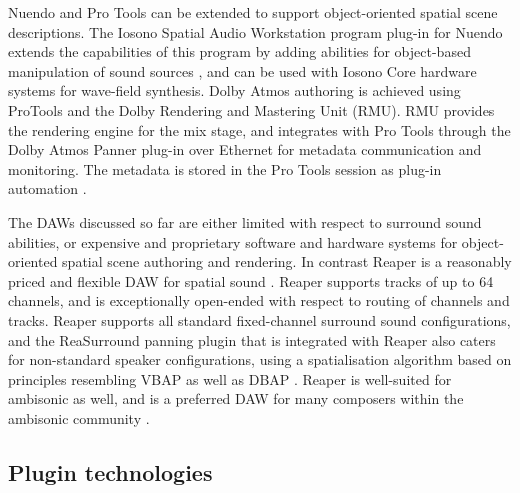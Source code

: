 \documentclass{article}
\begin{document}
Nuendo and Pro Tools can be extended to support object-oriented spatial scene descriptions.
The Iosono Spatial Audio Workstation program plug-in for Nuendo extends the capabilities of this program by adding abilities for object-based manipulation of sound sources \cite{iosono2012:workstation}, and can be used with Iosono Core hardware systems for wave-field synthesis.
Dolby Atmos authoring is achieved using ProTools and the Dolby Rendering and Mastering Unit (RMU).
RMU provides the rendering engine for the mix stage, and integrates with Pro Tools through the Dolby Atmos Panner plug-in over Ethernet for metadata communication and monitoring. 
The metadata is stored in the Pro Tools session as plug-in automation \cite{dolby:2013authoring}.

The DAWs discussed so far are either limited with respect to surround sound abilities, or expensive and proprietary software and hardware systems for object-ori\-ented spatial scene authoring and rendering.
In contrast Reaper is a reasonably priced and flexible DAW for spatial sound \cite{cockos:2014reaper}.
Reaper supports tracks of up to 64 channels, and is exceptionally open-ended with respect to routing of channels and tracks.
Reaper supports all standard fixed-channel surround sound configurations, and the ReaSurround panning plugin that is integrated with Reaper also caters for non-standard speaker configurations, using a spatialisation algorithm based on principles resembling VBAP \cite{Pulkki:1997vbap} as well as DBAP \cite{Lossius:2009dbap}.
Reaper is well-suited for ambisonic as well, and is a preferred DAW for many composers within the ambisonic  community \cite{wiggins:2012reaperhowto}.





\subsection{Plugin technologies}\label{sec:plugin-technologies}
\end{document}
